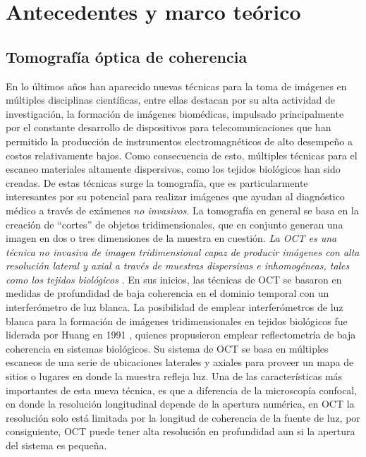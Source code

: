 \section{Antecedentes y marco teórico}
\label{sec:antecedentes_marco_teorico}
\subsection{Tomografía óptica de coherencia}

En lo últimos años han aparecido nuevas técnicas para la toma de imágenes en múltiples disciplinas científicas, entre ellas destacan por su alta actividad de investigación, la formación de imágenes biomédicas, impulsado principalmente por el constante desarrollo de dispositivos para telecomunicaciones que han permitido la producción de instrumentos electromagnéticos de alto desempeño a costos relativamente bajos. Como consecuencia de esto, múltiples técnicas para el escaneo materiales altamente dispersivos, como los tejidos biológicos han sido creadas. De estas técnicas surge la tomografía, que es particularmente interesantes por su potencial para realizar imágenes que ayudan al diagnóstico médico a través de exámenes \emph{no invasivos}. La tomografía en general se basa en la creación de ``cortes''  de objetos tridimensionales, que en conjunto generan una imagen en dos o tres dimensiones de la muestra en cuestión. \emph{La OCT es una técnica no invasiva de imagen tridimensional capaz de producir imágenes con alta resolución lateral y axial a través de muestras dispersivas e inhomogéneas, tales como los tejidos biológicos} \cite{Tomlins}. En sus inicios, las técnicas de OCT se basaron en medidas de profundidad de baja coherencia en el dominio temporal con un interferómetro de luz blanca. La posibilidad de emplear interferómetros de luz blanca para la formación de imágenes tridimensionales en tejidos biológicos fue liderada por Huang \etal en 1991 \cite{Huang1991}, quienes propusieron emplear reflectometría de baja coherencia en sistemas biológicos. Su sistema de OCT se basa en múltiples escaneos de una serie de ubicaciones laterales y axiales para proveer un mapa de sitios o lugares en donde la muestra refleja luz. Una de las características más importantes de esta nueva técnica, es que a diferencia de la microscopía confocal, en donde la resolución longitudinal depende de la apertura numérica, en OCT la resolución solo está limitada por la longitud de coherencia de la fuente de luz, por consiguiente, OCT puede tener alta resolución en profundidad aun si la apertura del sistema es pequeña.

